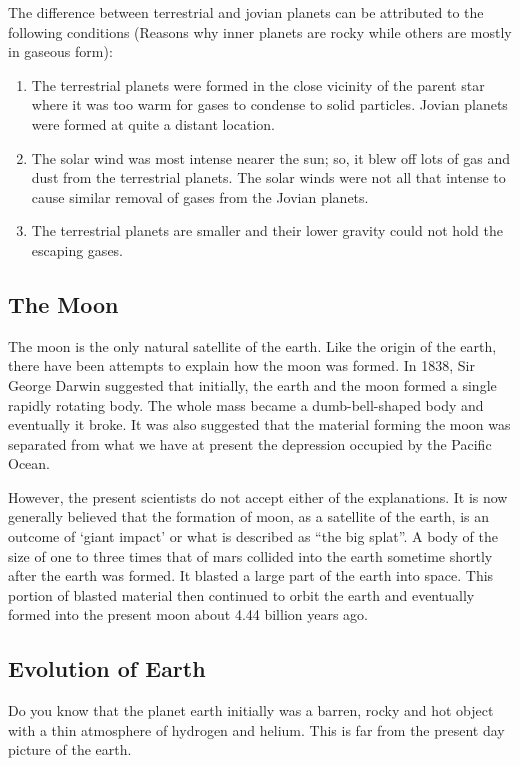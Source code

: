 \documentclass[8pt, a4paper, oneside, twocolumn]{extarticle}
\begin{document}
The difference between terrestrial and jovian planets can be attributed to the following conditions (Reasons why inner planets are rocky while others are mostly in gaseous form):
\begin{enumerate}
\item The terrestrial planets were formed in the close vicinity of the parent star where it was too warm for gases to condense to solid particles. Jovian planets were formed at quite a distant location. 
\item The solar wind was most intense nearer the sun; so, it blew off lots of gas and dust from the terrestrial planets. The solar winds were not all that intense to cause similar removal of gases from the Jovian planets. 
\item The terrestrial planets are smaller and their lower gravity could not hold the escaping gases.
\end{enumerate}

\subsection{The Moon}
The moon is the only natural satellite of the earth. Like the origin of the earth, there have been attempts to explain how the moon was formed. In 1838, Sir George Darwin suggested that initially, the earth and the moon formed a single rapidly rotating body. The whole mass became a dumb-bell-shaped body and eventually it broke. It was also suggested that the material forming the moon was separated from what we have at present the depression occupied by the Pacific Ocean.

However, the present scientists do not accept either of the explanations. It is now generally believed that the formation of moon, as a satellite of the earth, is an outcome of ‘giant impact’ or what is described as “the big splat”. A body of the size of one to three times that of mars collided into the earth sometime shortly after the earth was formed. It blasted a large part of the earth into space. This portion of blasted material then continued to orbit the earth and eventually formed into the present moon about 4.44 billion years ago.

\subsection{Evolution of Earth}

Do you know that the planet earth initially was a barren, rocky and hot object with a thin atmosphere of hydrogen and helium. This is far from the present day picture of the earth.
\end{document}
